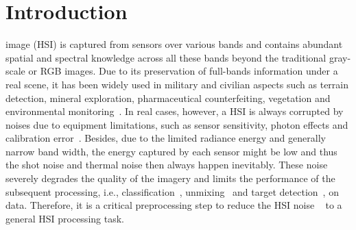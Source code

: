 \documentclass[journal]{IEEEtran}
\begin{document}
\section{Introduction}

 image (HSI) is captured from sensors over various bands and contains abundant spatial and spectral knowledge across all these bands beyond the traditional gray-scale or RGB images. Due to its preservation of full-bands information under a real scene, it has been widely used in military and civilian aspects such as terrain detection, mineral exploration, pharmaceutical counterfeiting, vegetation and environmental monitoring~\cite{plaza2009recent,goetz2009three,zhao2008object,chen2011hyperspectral,yuen2010introduction,qian2013hyperspectral}.   In real cases, however, a HSI is always corrupted by noises due to equipment limitations, such as sensor sensitivity, photon effects and calibration error~\cite{skauli2011sensor}. Besides, due to the limited radiance energy and generally narrow band width, the energy captured by each sensor might be low and thus the shot noise and thermal noise then always happen inevitably. These noise severely degrades the quality of the imagery and limits the performance of the subsequent processing, i.e., classification~\cite{sathya2015hyperspectral}, unmixing~\cite{qian2011hyperspectral, bioucas2012hyperspectral} and target detection~\cite{stein2002anomaly}, on data. Therefore, it is a critical preprocessing step to reduce the HSI noise ~\cite{peng2014decomposable, he2016total} to a general HSI processing task.
\end{document}

